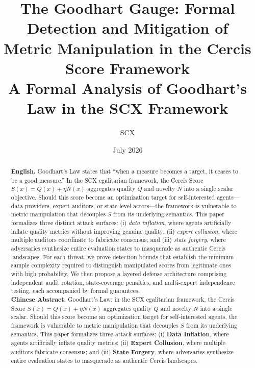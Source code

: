 \documentclass[11pt,a4paper]{article}
\title{
  \textbf{The Goodhart Gauge: Formal Detection and Mitigation of\\
  Metric Manipulation in the Cercis Score Framework}\\[0.5\baselineskip]
  \large A Formal Analysis of Goodhart's Law in the SCX Framework}
\author{SCX}
\date{July 2026}
\theoremstyle{plain}
\theoremstyle{definition}
\theoremstyle{remark}
\begin{document}
\maketitle
\begin{abstract}
\noindent
\textbf{English.}
Goodhart's Law states that ``when a measure becomes a target, it ceases to be a good measure.''
In the SCX egalitarian framework, the Cercis Score \(S(x) = Q(x) + \eta N(x)\) aggregates
quality \(Q\) and novelty \(N\) into a single scalar objective. Should this score become an
optimization target for self-interested agents---data providers, expert auditors, or
state-level actors---the framework is vulnerable to metric manipulation that decouples
\(S\) from its underlying semantics. This paper formalizes three distinct attack surfaces:
(i) \emph{data inflation}, where agents artificially inflate quality metrics without
improving genuine quality; (ii) \emph{expert collusion}, where multiple auditors coordinate
to fabricate consensus; and (iii) \emph{state forgery}, where adversaries synthesize entire
evaluation states to masquerade as authentic Cercis landscapes. For each threat, we prove
detection bounds that establish the minimum sample complexity required to distinguish
manipulated scores from legitimate ones with high probability. We then propose a layered
defense architecture comprising independent audit rotation, state-coverage penalties, and
multi-expert independence testing, each accompanied by formal guarantees.
\\[0.3\baselineskip]
\noindent
\textbf{Chinese Abstract.}
Goodhart's Law: in the SCX egalitarian framework, the Cercis Score \(S(x)=Q(x)+\eta N(x)\) aggregates quality \(Q\) and novelty \(N\) into a single scalar. Should this score become an optimization target for self-interested agents, the framework is vulnerable to metric manipulation that decouples \(S\) from its underlying semantics. This paper formalizes three attack surfaces: (i) \textbf{Data Inflation}, where agents artificially inflate quality metrics; (ii) \textbf{Expert Collusion}, where multiple auditors fabricate consensus; and (iii) \textbf{State Forgery}, where adversaries synthesize entire evaluation states to masquerade as authentic Cercis landscapes.
\end{abstract}
\end{document}
